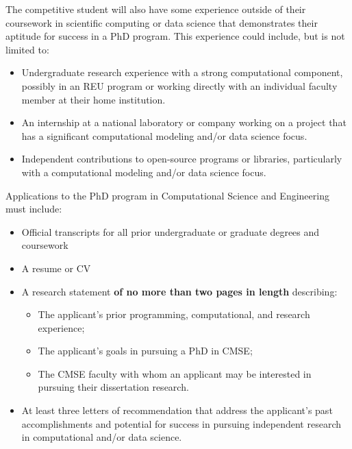 The competitive student will also have some experience outside of
their coursework in scientific computing or data science that
demonstrates their aptitude for success in a PhD program.  This
experience could include, but is not limited to:  

\begin{itemize}
\item Undergraduate research experience with a strong computational
  component, possibly in an REU program or working directly with an
  individual faculty member at their home institution.

\item An internship at a national laboratory or company working on a
  project that has a significant computational modeling and/or data
  science focus.

\item Independent contributions to open-source programs or libraries,
  particularly with a computational modeling and/or data science
  focus.
\end{itemize}

Applications to the PhD program in Computational Science and
Engineering must include:

\begin{itemize}
\item Official transcripts for all prior undergraduate or graduate degrees and coursework
\item A resume or CV
\item A research statement \textbf{of no more than two pages in length}
  describing:  

\begin{itemize}
  \item The applicant's prior programming, computational, and research experience;  
  \item The applicant's goals in pursuing a PhD in CMSE;  
  \item  The CMSE faculty with whom an applicant may be interested in
    pursuing their dissertation research.  
\end{itemize}

\item At least three letters of recommendation that address the applicant's past accomplishments and potential for success in pursuing independent research in computational and/or data science.
\end{itemize}

